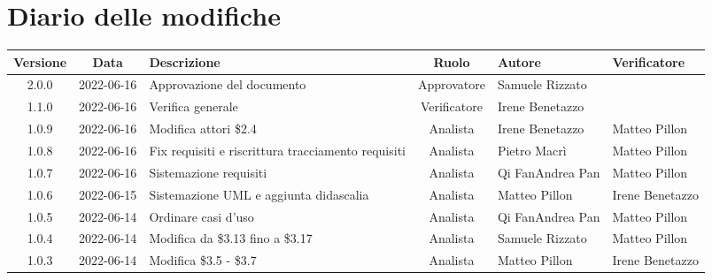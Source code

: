 \section*{Diario delle modifiche}
	\begin{center}
	\renewcommand{\arraystretch}{1.8} %
	\begin{longtable}{ |c|c|p{8em}|c|m{5em}|m{5em}| }
	\hline
	\textbf{Versione} & \textbf{Data} & \textbf{Descrizione} &  \textbf{Ruolo} &  \textbf{Autore} & \textbf{Verificatore}\\ %
	\hline
	2.0.0 & 2022-06-16 & Approvazione del documento & Approvatore & Samuele \newline Rizzato & \\
	\hline
	1.1.0 & 2022-06-16 & Verifica generale & Verificatore & Irene \newline Benetazzo & \\
	\hline
	1.0.9 & 2022-06-16 & Modifica attori \$2.4 & Analista & Irene \newline Benetazzo & Matteo \newline Pillon\\
	\hline
	1.0.8 & 2022-06-16 & Fix requisiti e riscrittura tracciamento requisiti & Analista & Pietro \newline Macrì & Matteo \newline Pillon\\
	\hline
	1.0.7 & 2022-06-16 & Sistemazione requisiti & Analista & Qi Fan\newline Andrea Pan & Matteo \newline Pillon\\
	\hline
	1.0.6 & 2022-06-15 & Sistemazione UML \newline e aggiunta didascalia  & Analista & Matteo \newline Pillon & Irene \newline Benetazzo \\
	\hline
	1.0.5 & 2022-06-14 & Ordinare casi d'uso  & Analista & Qi Fan\newline Andrea Pan & Matteo \newline Pillon \\
	\hline
	1.0.4 & 2022-06-14 & Modifica da \$3.13 \newline fino a \$3.17 & Analista & Samuele	\newline Rizzato & Matteo \newline Pillon\\
	\hline
	1.0.3 & 2022-06-14 & Modifica \newline \$3.5 - \$3.7 & Analista & Matteo	\newline Pillon & Irene \newline Benetazzo\\

\end{longtable}
\end{center}

